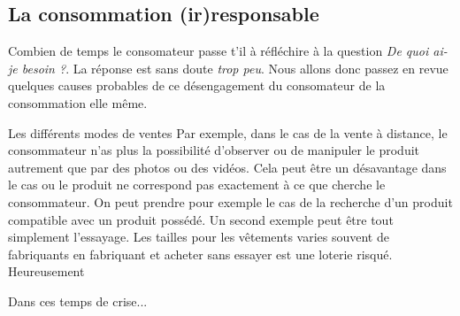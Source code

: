 \subsection{La consommation (ir)responsable}

Combien de temps le consomateur passe t'il à réfléchire à la question \textit{De quoi ai-je besoin ?}.
La réponse est sans doute \textit{trop peu}. Nous allons donc passez en revue quelques causes probables de ce désengagement du consomateur de la consommation elle même.

\medbreak
Les différents modes de ventes 
Par exemple, dans le cas de la vente à distance, le consommateur n'as plus la possibilité d'observer ou de manipuler le produit autrement que par des photos ou des vidéos.
Cela peut être un désavantage dans le cas ou le produit ne correspond pas exactement à ce que cherche le consommateur.
\smallbreak
On peut prendre pour exemple le cas de la recherche d'un produit compatible avec un produit possédé.
Un second exemple peut être tout simplement l'essayage. Les tailles pour les vêtements varies souvent de fabriquants en fabriquant et acheter sans essayer est une loterie risqué.
\smallbreak
 Heureusement %

\medbreak
Dans ces temps de crise... %


